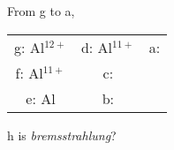 \begin{parts}
	From g to a,
	\begin{tabular}{c c c}
		g: Al${}^{12+}$ & d: Al${}^{11+}$ & a: \\
		f: Al${}^{11+}$ & c: & \\
		e: Al & b: &
	\end{tabular}
	
	h is \textit{bremsstrahlung}?
\end{parts}